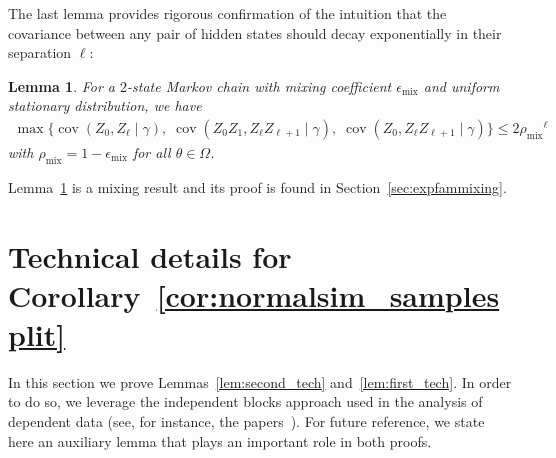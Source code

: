\documentclass[twoside,11pt]{article}
\newtheorem{lems}{Lemma}
\DeclareMathOperator{\cov}{cov}
\newcommand{\mixcoef}{\ensuremath{\rho_{\mathrm{mix}}}}
\newcommand{\mixcoefeps}{\ensuremath{\epsilon_{\mathrm{mix}}}}
\newcommand{\paramjoint}{\theta}
\newcommand{\paramgamma}{\gamma}
\newcommand{\condcov}[3]{\cov(#1, #2 \mid #3)}
\newcommand{\DomTheta}{\ensuremath{\Omega}}
\begin{document}
%
\noindent The last lemma provides rigorous confirmation of the
intuition that the covariance between any pair of hidden states should
decay exponentially in their separation $\ell$:
\begin{lems}
\label{lem:expfammixing0}
For a $2$-state Markov chain with mixing coefficient $\mixcoefeps$
and uniform stationary distribution, we have
\begin{align}
\label{eq:expfamonestatemixing}
\max \Big \{ \condcov{Z_0}{Z_{\ell}}{\paramgamma}, \;
\condcov{Z_0Z_1}{Z_{\ell}Z_{\ell+1}}{\paramgamma}, \;
\condcov{Z_0}{Z_{\ell}Z_{\ell+1}}{\paramgamma} \Big \} \leq 2
\mixcoef^{\ell}
\end{align}
with $\mixcoef = 1 - \mixcoefeps$ for all $\paramjoint \in \DomTheta$.
\end{lems}
%
\noindent 

Lemma~\ref{lem:expfammixing0} is a mixing result and its proof
is found in Section~\ref{sec:expfammixing}.





\section{Technical details for Corollary~\ref{cor:normalsim_samplesplit}}

In this section we prove Lemmas~\ref{lem:second_tech}
and~\ref{lem:first_tech}.  In order to do so, we leverage the
independent blocks approach used in the analysis of dependent data
(see, for instance, the papers~\cite{Yu94, NobDem93}).  For future
reference, we state here an auxiliary lemma that plays an important
role in both proofs.
\end{document}
